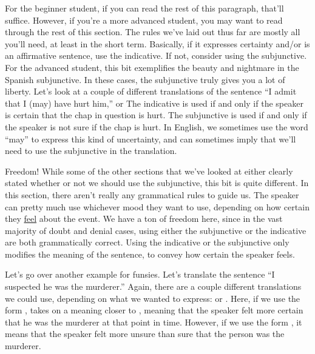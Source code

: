 For the beginner student, if you can read the rest of this paragraph, that'll suffice. However, if you're a more advanced student, you may want to read through the rest of this section. The rules we've laid out thus far are mostly all you'll need, at least in the short term. Basically, if it expresses certainty and/or is an affirmative sentence, use the indicative. If not, consider using the subjunctive. \\

For the advanced student, this bit exemplifies the beauty and nightmare in the Spanish subjunctive. In these cases, the subjunctive truly gives you a lot of liberty. Let's look at a couple of different translations of the sentence ``I admit that I (may) have hurt him,''  or  The indicative is used if and only if the speaker is certain that the chap in question is hurt. The subjunctive is used if and only if the speaker is not sure if the chap is hurt. In English, we sometimes use the word ``may'' to express this kind of uncertainty, and can sometimes imply that we'll need to use the subjunctive in the translation.

\begin{conf}{Freedom!}
	While some of the other sections that we've looked at either clearly stated whether or not we should use the subjunctive, this bit is quite different. In this section, there aren't really any grammatical rules to guide us. The speaker can pretty much use whichever mood they want to use, depending on how certain they \underline{feel} about the event. We have a ton of freedom here, since in the vast majority of doubt and denial cases, using either the subjunctive or the indicative are both grammatically correct. Using the indicative or the subjunctive only modifies the meaning of the sentence, to convey how certain the speaker feels. 
\end{conf}

Let's go over another example for funsies. Let's translate the sentence ``I suspected he was the murderer.'' Again, there are a couple different translations we could use, depending on what we wanted to express:  or . Here, if we use the form ,  takes on a meaning closer to , meaning that the speaker felt more certain that he was the murderer at that point in time. However, if we use the form , it means that the speaker felt more unsure than sure that the person was the murderer. 

